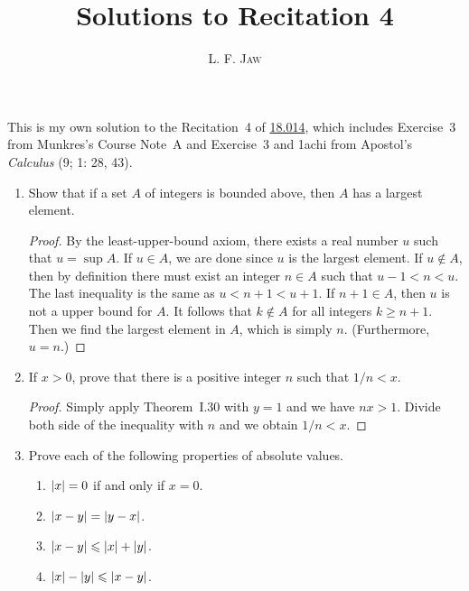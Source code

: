 \documentclass[a4paper]{article}
\title{Solutions to Recitation 4}
\author{L. F. \textsc{Jaw}}
\begin{document}
\maketitle

This is my own solution to the Recitation~4 of
\href{https://ocw.mit.edu/courses/mathematics/18-014-calculus-with-theory-fall-2010/recitations/}{18.014},
which includes Exercise~3 from Munkres's Course Note~A and Exercise~3 and
1achi from Apostol's \textit{Calculus} (9; 1: 28, 43).

\begin{enumerate}
\item Show that if a set \(A\) of integers is bounded above, then
  \(A\) has a largest element.

  \begin{proof}
    By the least-upper-bound axiom, there exists a real number \(u\) such
    that \(u = \sup A\).  If \(u \in A\), we are done since \(u\) is the
    largest element.  If \(u \notin A\), then by definition there must
    exist an integer \(n \in A\) such that \(u-1 < n < u\).  The last
    inequality is the same as \(u < n+1 < u+1\).  If \(n+1 \in A\), then
    \(u\) is not a upper bound for \(A\).  It follows that \(k \notin A\)
    for all integers \(k \ge n+1\).  Then we find the largest element in
    \(A\), which is simply \(n\).  (Furthermore, \(u = n\).)
  \end{proof}

\item If \(x > 0\), prove that there is a positive integer \(n\) such that
  \(1/n < x\).

  \begin{proof}
    Simply apply Theorem~I.30 with \(y = 1\) and we have \(nx > 1\).
    Divide both side of the inequality with \(n\) and we obtain
    \(1/n < x\).
  \end{proof}
  
\item Prove each of the following properties of absolute values.
  \begin{enumerate}
  \item \(\lvert x\rvert = 0\) if and only if \(x = 0\).
  \item \(\lvert x-y\rvert = \lvert y-x\rvert\).
  \item \(\abs{x-y} \le \abs{x} + \abs{y}\).
  \item \(\abs{x} - \abs{y} \le \abs{x-y}\).
  \end{enumerate}
\end{enumerate}
\end{document}
